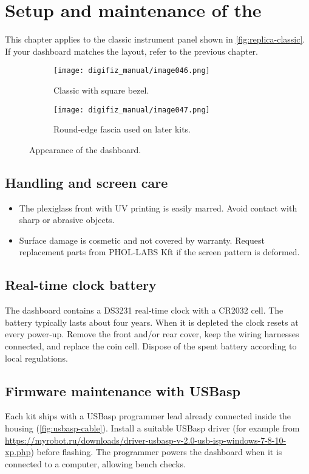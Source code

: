 \chapter{Setup and maintenance of the \ReplicaGenOne{}}\label{ch:replica-setup}

This chapter applies to the classic \ReplicaGenOne{} instrument panel shown in \autoref{fig:replica-classic}. If your dashboard matches the \ReplicaNextLong{} layout, refer to the previous chapter.

\begin{figure}[htbp]
    \centering
    \begin{subfigure}{0.46\textwidth}
        \texttt{[image: digifiz\_manual/image046.png]}
        \caption{Classic \ReplicaGenOne{} with square bezel.}
    \end{subfigure}\hfill
    \begin{subfigure}{0.46\textwidth}
        \texttt{[image: digifiz\_manual/image047.png]}
        \caption{Round-edge fascia used on later kits.}
    \end{subfigure}
    \caption{Appearance of the \ReplicaGenOne{} dashboard.}
    \label{fig:replica-classic}
\end{figure}

\section{Handling and screen care}
\begin{itemize}
    \item The plexiglass front with UV printing is easily marred. Avoid contact with sharp or abrasive objects.
    \item Surface damage is cosmetic and not covered by warranty. Request replacement parts from PHOL-LABS Kft if the screen pattern is deformed.
\end{itemize}

\section{Real-time clock battery}
The dashboard contains a DS3231 real-time clock with a CR2032 cell. The battery typically lasts about four years. When it is depleted the clock resets at every power-up. Remove the front and/or rear cover, keep the wiring harnesses connected, and replace the coin cell. Dispose of the spent battery according to local regulations.

\section{Firmware maintenance with USBasp}
Each kit ships with a USBasp programmer lead already connected inside the housing (\autoref{fig:usbasp-cable}). Install a suitable USBasp driver (for example from \url{https://myrobot.ru/downloads/driver-usbasp-v-2.0-usb-isp-windows-7-8-10-xp.php}) before flashing. The programmer powers the dashboard when it is connected to a computer, allowing bench checks.

